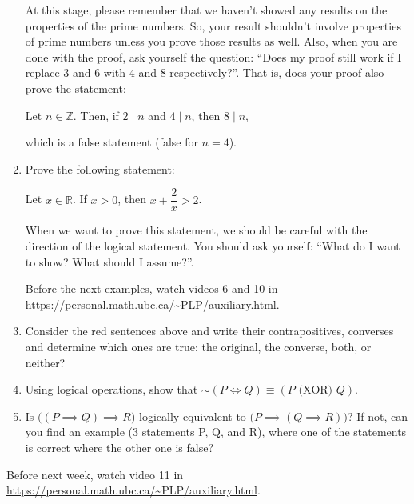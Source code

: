 \documentclass[12pt]{article}
\renewcommand{\neg}{\sim}
\begin{document}
\begin{enumerate}
At this stage, please remember that we haven't showed any results on the properties of the prime numbers. So, your result shouldn't involve properties of prime numbers unless you prove those results as well. Also, when you are done with the proof, ask yourself the question: ``Does my proof still work if I replace $3$ and $6$ with $4$ and $8$ respectively?''. That is, does your proof also prove the statement:
\begin{center}
Let $n\in\mathbb Z$. Then, if $2\mid n$ and $4\mid n$, then $8\mid n$,
\end{center}	
which is a false statement (false for $n=4$).

\item Prove the following statement:
\begin{center}
Let $x\in\mathbb R$. If $x>0$, then $x+\dfrac{2}{x}>2$.
\end{center}

When we want to prove this statement, we should be careful with the direction of the logical statement. You should ask yourself: ``What do I want to show? What should I assume?''.


Before the next examples, watch videos 6 and 10 in \url{https://personal.math.ubc.ca/~PLP/auxiliary.html}.

\item Consider the {\color{red} red sentences} above and write their contrapositives, converses and determine which ones are true: the original, the converse, both, or neither?

\item Using logical operations, show that $\neg (P\iff Q)\equiv (P \text{ (XOR) } Q)$.

\item Is $\big((P\implies Q)\implies R\big)$ logically equivalent to $\big(P\implies (Q\implies R)\big)$? If not, can you find an example ($3$ statements P, Q, and R), where one of the statements is correct where the other one is false?

\end{enumerate}

Before next week, watch video 11 in \url{https://personal.math.ubc.ca/~PLP/auxiliary.html}.
\end{document}
